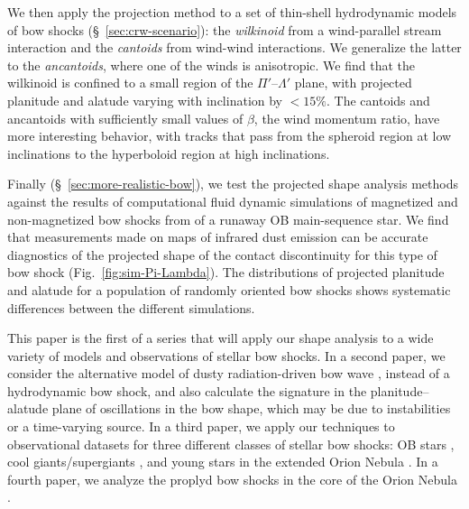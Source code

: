 We then apply the projection method to a set of thin-shell
hydrodynamic models of bow shocks (\S~\ref{sec:crw-scenario}): the
\textit{wilkinoid} from a wind-parallel stream interaction and the
\textit{cantoids} from wind-wind interactions.  We generalize the
latter to the \textit{ancantoids}, where one of the winds is
anisotropic.  We find that the wilkinoid is confined to a small region
of the \(\Pi'\)--\(\Lambda'\) plane, with projected planitude and alatude
varying with inclination by \(< 15\%\).  The cantoids and ancantoids
with sufficiently small values of \(\beta\), the wind momentum ratio, have
more interesting behavior, with tracks that pass from the spheroid
region at low inclinations to the hyperboloid region at high
inclinations.

Finally (\S~\ref{sec:more-realistic-bow}), we test the projected shape
analysis methods against the results of computational fluid dynamic
simulations of magnetized and non-magnetized bow shocks from
\citet{Meyer:2017a} of a runaway OB main-sequence star.  We find that
measurements made on maps of infrared dust emission can be accurate
diagnostics of the projected shape of the contact discontinuity for
this type of bow shock (Fig.~\ref{fig:sim-Pi-Lambda}).  The
distributions of projected planitude and alatude for a population of
randomly oriented bow shocks shows systematic differences between the
different simulations.

This paper is the first of a series that will apply our shape analysis
to a wide variety of models and observations of stellar bow shocks.
In a second paper, %
we consider the alternative model of dusty radiation-driven bow wave
\citep{Ochsendorf:2014a}, instead of a hydrodynamic bow shock, and
also calculate the signature in the planitude--alatude plane of
oscillations in the bow shape, which may be due to instabilities or a
time-varying source.  In a third paper, %
we apply our techniques to observational datasets for three different
classes of stellar bow shocks: OB stars \citep{Kobulnicky:2016a}, cool
giants/supergiants \citep{Cox:2012a}, and young stars in the extended
Orion Nebula \citep{Henney:2013a}.  In a fourth paper,
we analyze the proplyd bow shocks in the core of the Orion Nebula
\citep{Garcia-Arredondo:2001a}.



